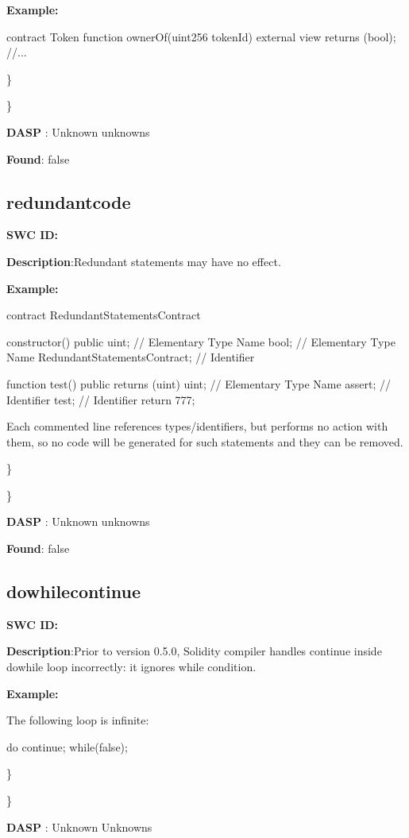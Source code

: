 \documentclass{article}
\begin{document}
{\textbf{Example:} 

contract Token{
    function ownerOf(uint256 \textunderscore tokenId) external view returns (bool);
    //...
}

\} 

\} 

\textbf{DASP} : Unknown unknowns

\textbf{Found}: false

\subsection{redundant\textunderscore code} 
\textbf{SWC \textunderscore ID:} 

\textbf{Description}:Redundant statements may have no effect.


\textbf{Example:} 

contract RedundantStatementsContract {

    constructor() public {
        uint; // Elementary Type Name
        bool; // Elementary Type Name
        RedundantStatementsContract; // Identifier
    }

    function test() public returns (uint) {
        uint; // Elementary Type Name
        assert; // Identifier
        test; // Identifier
        return 777;
    }
}

Each commented line references types/identifiers, but performs no action with them, so no code will be generated for such statements and they can be removed.

\} 

\} 

\textbf{DASP} : Unknown unknowns

\textbf{Found}: false

\subsection{do\textunderscore while\textunderscore continue} 
\textbf{SWC \textunderscore ID:} 

\textbf{Description}:Prior to version 0.5.0, Solidity compiler handles continue inside do\textendash while loop incorrectly: it ignores while condition.


\textbf{Example:} 

The following loop is infinite:

do {
    continue;
} while(false);

\} 

\} 

\textbf{DASP} : Unknown Unknowns

}
\end{document}
